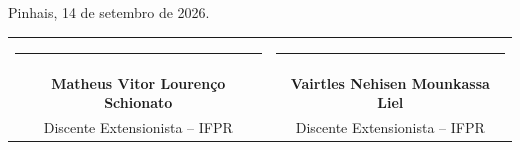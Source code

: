 \bigskip
\noindent
Pinhais, 14 de setembro de 2026.

\bigskip\bigskip
\noindent
\begin{center}
\begin{tabular}{cc}
\rule{6.5cm}{0.5pt} & \rule{6.5cm}{0.5pt} \\
\textbf{Matheus Vitor Lourenço Schionato} & \textbf{Vairtles Nehisen Mounkassa Liel} \\
Discente Extensionista -- IFPR & Discente Extensionista -- IFPR \\
\end{tabular}
\end{center}
